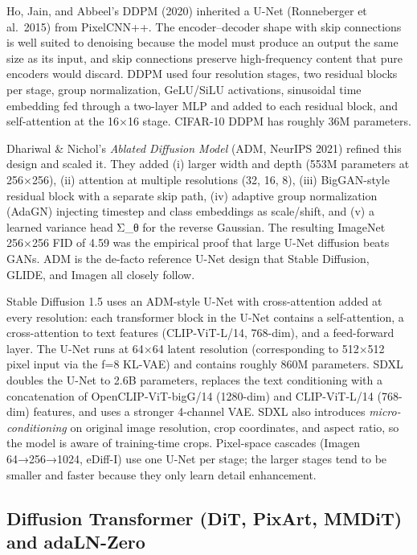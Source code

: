 Ho, Jain, and Abbeel's DDPM (2020) inherited a U-Net (Ronneberger et al.~2015) from PixelCNN++. The encoder--decoder shape with skip connections is well suited to denoising because the model must produce an output the same size as its input, and skip connections preserve high-frequency content that pure encoders would discard. DDPM used four resolution stages, two residual blocks per stage, group normalization, GeLU/SiLU activations, sinusoidal time embedding fed through a two-layer MLP and added to each residual block, and self-attention at the 16×16 stage. CIFAR-10 DDPM has roughly 36M parameters.

Dhariwal \& Nichol's \emph{Ablated Diffusion Model} (ADM, NeurIPS 2021) refined this design and scaled it. They added (i) larger width and depth (553M parameters at 256×256), (ii) attention at multiple resolutions (32, 16, 8), (iii) BigGAN-style residual block with a separate skip path, (iv) adaptive group normalization (AdaGN) injecting timestep and class embeddings as scale/shift, and (v) a learned variance head Σ\_θ for the reverse Gaussian. The resulting ImageNet 256×256 FID of 4.59 was the empirical proof that large U-Net diffusion beats GANs. ADM is the de-facto reference U-Net design that Stable Diffusion, GLIDE, and Imagen all closely follow.

Stable Diffusion 1.5 uses an ADM-style U-Net with cross-attention added at every resolution: each transformer block in the U-Net contains a self-attention, a cross-attention to text features (CLIP-ViT-L/14, 768-dim), and a feed-forward layer. The U-Net runs at 64×64 latent resolution (corresponding to 512×512 pixel input via the f=8 KL-VAE) and contains roughly 860M parameters. SDXL doubles the U-Net to 2.6B parameters, replaces the text conditioning with a concatenation of OpenCLIP-ViT-bigG/14 (1280-dim) and CLIP-ViT-L/14 (768-dim) features, and uses a stronger 4-channel VAE. SDXL also introduces \emph{micro-conditioning} on original image resolution, crop coordinates, and aspect ratio, so the model is aware of training-time crops. Pixel-space cascades (Imagen 64→256→1024, eDiff-I) use one U-Net per stage; the larger stages tend to be smaller and faster because they only learn detail enhancement.

\subsection{Diffusion Transformer (DiT, PixArt, MMDiT) and adaLN-Zero}\label{diffusion-transformer-dit-pixart-mmdit-and-adaln-zero}


